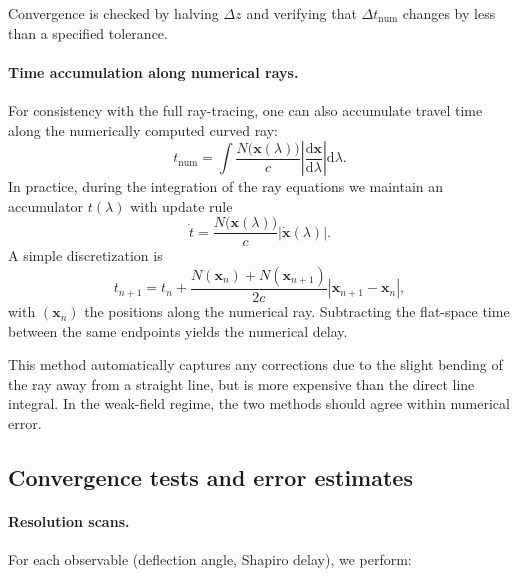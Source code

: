 \documentclass[11pt]{article}
\begin{document}
Convergence is checked by halving $\Delta z$ and verifying that
$\Delta t_\mathrm{num}$ changes by less than a specified tolerance.

\paragraph{Time accumulation along numerical rays.}

For consistency with the full ray-tracing, one can also accumulate travel
time along the numerically computed curved ray:
\begin{equation}
  t_\mathrm{num}
  = \int \frac{N\bigl(\mathbf{x}(\lambda)\bigr)}{c}
         \left|\frac{\mathrm{d}\mathbf{x}}{\mathrm{d}\lambda}\right|
         \mathrm{d}\lambda.
\end{equation}
In practice, during the integration of the ray equations we maintain an
accumulator $t(\lambda)$ with update rule
\begin{equation}
  \dot{t}
  = \frac{N\bigl(\mathbf{x}(\lambda)\bigr)}{c}
    \left|\dot{\mathbf{x}}(\lambda)\right|.
\end{equation}
A simple discretization is
\begin{equation}
  t_{n+1}
  = t_n
    + \frac{N(\mathbf{x}_n) + N(\mathbf{x}_{n+1})}{2c}
      \left|\mathbf{x}_{n+1} - \mathbf{x}_n\right|,
\end{equation}
with $(\mathbf{x}_n)$ the positions along the numerical ray.
Subtracting the flat-space time between the same endpoints yields the
numerical delay.

This method automatically captures any corrections due to the slight
bending of the ray away from a straight line, but is more expensive than
the direct line integral.
In the weak-field regime, the two methods should agree within numerical
error.


\subsection{Convergence tests and error estimates}
\label{subsec:app-convergence}

\paragraph{Resolution scans.}

For each observable (deflection angle, Shapiro delay), we perform:
\end{document}
